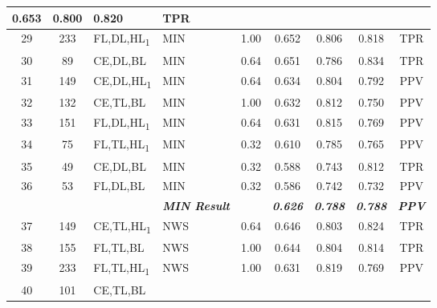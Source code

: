 \begin{table}[H]
{\begin{tabular}{ccl|l|c|c|c|c|c|}
    0.653 &
    0.800 &
    0.820 &
    TPR \\ \hline
  \multicolumn{1}{|c|}{29} &
    \multicolumn{1}{c|}{233} &
    FL,DL,HL\textsubscript{1} &
    MIN &
    1.00 &
    0.652 &
    0.806 &
    0.818 &
    TPR \\ \hline
  \multicolumn{1}{|c|}{30} &
    \multicolumn{1}{c|}{89} &
    CE,DL,BL &
    MIN &
    0.64 &
    0.651 &
    0.786 &
    0.834 &
    TPR \\ \hline
  \multicolumn{1}{|c|}{31} &
    \multicolumn{1}{c|}{149} &
    CE,DL,HL\textsubscript{1} &
    MIN &
    0.64 &
    0.634 &
    0.804 &
    0.792 &
    PPV \\ \hline
  \multicolumn{1}{|c|}{32} &
    \multicolumn{1}{c|}{132} &
    CE,TL,BL &
    MIN &
    1.00 &
    0.632 &
    0.812 &
    0.750 &
    PPV \\ \hline
  \multicolumn{1}{|c|}{33} &
    \multicolumn{1}{c|}{151} &
    FL,DL,HL\textsubscript{1} &
    MIN &
    0.64 &
    0.631 &
    0.815 &
    0.769 &
    PPV \\ \hline
  \multicolumn{1}{|c|}{34} &
    \multicolumn{1}{c|}{75} &
    FL,TL,HL\textsubscript{1} &
    MIN &
    0.32 &
    0.610 &
    0.785 &
    0.765 &
    PPV \\ \hline
  \multicolumn{1}{|c|}{35} &
    \multicolumn{1}{c|}{49} &
    CE,DL,BL &
    MIN &
    0.32 &
    0.588 &
    0.743 &
    0.812 &
    TPR \\ \hline
  \multicolumn{1}{|c|}{36} &
    \multicolumn{1}{c|}{53} &
    FL,DL,BL &
    MIN &
    0.32 &
    0.586 &
    0.742 &
    0.732 &
    PPV \\ \hline
   &
    \textit{\textbf{}} &
     &
    \textit{\textbf{MIN Result}} &
     &
    \textit{\textbf{0.626}} &
    \textit{\textbf{0.788}} &
    \textit{\textbf{0.788}} &
    \textit{\textbf{PPV}} \\ \hline
  \multicolumn{1}{|c|}{37} &
    \multicolumn{1}{c|}{149} &
    CE,TL,HL\textsubscript{1} &
    NWS &
    0.64 &
    0.646 &
    0.803 &
    0.824 &
    TPR \\ \hline
  \multicolumn{1}{|c|}{38} &
    \multicolumn{1}{c|}{155} &
    FL,TL,BL &
    NWS &
    1.00 &
    0.644 &
    0.804 &
    0.814 &
    TPR \\ \hline
  \multicolumn{1}{|c|}{39} &
    \multicolumn{1}{c|}{233} &
    FL,TL,HL\textsubscript{1} &
    NWS &
    1.00 &
    0.631 &
    0.819 &
    0.769 &
    PPV \\ \hline
  \multicolumn{1}{|c|}{40} &
    \multicolumn{1}{c|}{101} &
    CE,TL,BL &

\end{tabular}}
\end{table}
